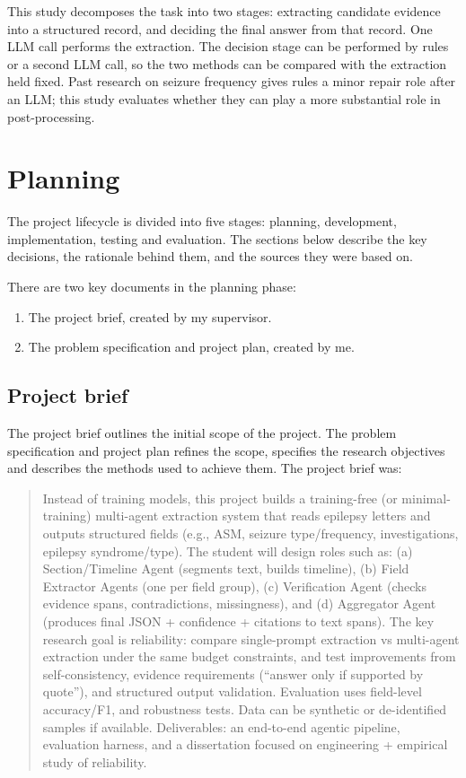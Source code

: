 \documentclass[conference]{IEEEtran}
\begin{document}
This study decomposes the task into two stages: 
extracting candidate evidence into a structured 
record, and deciding the final answer from that 
record. One LLM call performs the extraction. The 
decision stage can be performed by rules or a second LLM 
call, so the two methods can be compared with the 
extraction held fixed. Past research on seizure 
frequency gives rules a minor repair role after an 
LLM; this study evaluates whether they can play
a more substantial role in post-processing.

\section{Planning}

The project lifecycle is divided into five stages:
planning, development, implementation, testing and
evaluation. The sections below describe the key
decisions, the rationale behind them, and the
sources they were based on.

There are two key documents in the planning 
phase: 

\begin{enumerate}
\item The project brief, created by my supervisor.
\item The problem specification and project plan, 
created by me.
\end{enumerate}

\subsection{Project brief}

The project brief outlines the initial scope of the
project. The problem specification and project
plan refines the scope, specifies the research 
objectives and describes the methods used to
achieve them. The project brief was:

\begin{quote}
Instead of training models, this project builds a 
training-free (or minimal-training) multi-agent 
extraction system that reads epilepsy letters and 
outputs structured fields (e.g., ASM, seizure 
type/frequency, investigations, epilepsy 
syndrome/type). The student will design roles 
such as: (a) Section/Timeline Agent (segments 
text, builds timeline), (b) Field Extractor Agents 
(one per field group), (c) Verification Agent 
(checks evidence spans, contradictions, 
missingness), and (d) Aggregator Agent 
(produces final JSON + confidence + citations 
to text spans). The key research goal is 
reliability: compare single-prompt extraction 
vs multi-agent extraction under the same 
budget constraints, and test improvements 
from self-consistency, evidence requirements 
(“answer only if supported by quote”), and 
structured output validation. Evaluation uses 
field-level accuracy/F1,  and robustness tests. 
Data can be synthetic or de-identified samples 
if available. Deliverables: an end-to-end agentic 
pipeline, evaluation harness, and a dissertation 
focused on engineering + empirical study of 
reliability.
\end{quote}
\end{document}
